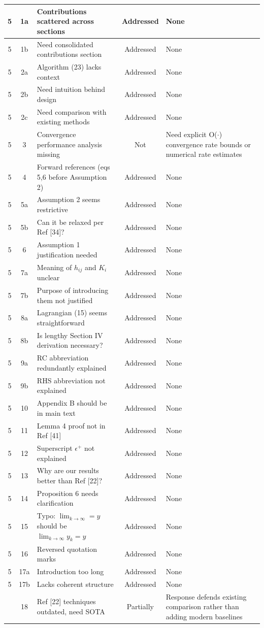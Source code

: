 \documentclass[journal,twoside,web]{ieeecolor}
\newcommand{\rev}[1]{\textcolor{revisionblue}{#1}}
\begin{document}
\begin{longtable}{|c|c|p{5.5cm}|c|p{3.5cm}|}
5 & 1a & Contributions scattered across sections & Addressed & None \\
\hline
5 & 1b & Need consolidated contributions section & Addressed & None \\
\hline
5 & 2a & Algorithm (23) lacks context & Addressed & None \\
\hline
5 & 2b & Need intuition behind design & Addressed & None \\
\hline
5 & 2c & Need comparison with existing methods & Addressed & None \\
\hline
5 & 3 & Convergence performance analysis missing & Not & Need explicit O($\cdot$) convergence rate bounds or numerical rate estimates \\
\hline
5 & 4 & Forward references (eqs 5,6 before Assumption 2) & Addressed & None \\
\hline
5 & 5a & Assumption 2 seems restrictive & Addressed & None \\
\hline
5 & 5b & Can it be relaxed per Ref [34]? & Addressed & None \\
\hline
5 & 6 & Assumption 1 justification needed & Addressed & None \\
\hline
5 & 7a & Meaning of $h_{ij}$ and $K_i$ unclear & Addressed & None \\
\hline
5 & 7b & Purpose of introducing them not justified & Addressed & None \\
\hline
5 & 8a & Lagrangian (15) seems straightforward & Addressed & None \\
\hline
5 & 8b & Is lengthy Section IV derivation necessary? & Addressed & None \\
\hline
5 & 9a & RC abbreviation redundantly explained & Addressed & None \\
\hline
5 & 9b & RHS abbreviation not explained & Addressed & None \\
\hline
5 & 10 & Appendix B should be in main text & Addressed & None \\
\hline
5 & 11 & Lemma 4 proof not in Ref [41] & Addressed & None \\
\hline
5 & 12 & Superscript $\epsilon^+$ not explained & Addressed & None \\
\hline
5 & 13 & Why are our results better than Ref [22]? & Addressed & None \\
\hline
5 & 14 & Proposition 6 needs clarification & Addressed & None \\
\hline
5 & 15 & Typo: $\lim_{k\to\infty}=y$ should be $\lim_{k\to\infty}y_k=y$ & Addressed & None \\
\hline
5 & 16 & Reversed quotation marks & Addressed & None \\
\hline
5 & 17a & Introduction too long & Addressed & None \\
\hline
5 & 17b & Lacks coherent structure & Addressed & None \\
\hline
\rev{5 & 18 & Ref [22] techniques outdated, need SOTA & Partially & Response defends existing comparison rather than adding modern baselines} \\
\hline


\end{longtable}
\end{document}
